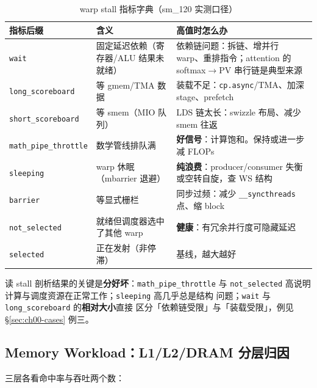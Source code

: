 \begin{table}[htbp]
\centering
\caption{warp stall 指标字典（sm\_120 实测口径）}
\label{tab:00-stall}
\begin{tabular}{lp{5.2cm}p{5.6cm}}
\toprule
指标后缀 & 含义 & 高值时怎么办 \\
\midrule
\texttt{wait} & 固定延迟依赖（寄存器/ALU 结果未就绪） & 依赖链问题：拆链、增并行 warp、重排指令；attention 的 softmax$\to$PV 串行链是典型来源 \\
\texttt{long\_\allowbreak{}scoreboard} & 等 gmem/TMA 数据 & 装载不足：\texttt{cp.async}/TMA、加深 stage、prefetch \\
\texttt{short\_\allowbreak{}scoreboard} & 等 smem（MIO 队列） & LDS 链太长：swizzle 布局、减少 smem 往返 \\
\texttt{math\_\allowbreak{}pipe\_\allowbreak{}throttle} & 数学管线排队满 & \textbf{好信号}：计算饱和。保持或进一步减 FLOPs \\
\texttt{sleeping} & warp 休眠（mbarrier 退避） & \textbf{纯浪费}：producer/consumer 失衡或空转自旋，查 WS 结构 \\
\texttt{barrier} & 等显式栅栏 & 同步过频：减少 \texttt{\_\allowbreak{}\_\allowbreak{}syncthreads} 点、缩 block \\
\texttt{not\_\allowbreak{}selected} & 就绪但调度器选中了其他 warp & \textbf{健康}：有冗余并行度可隐藏延迟 \\
\texttt{selected} & 正在发射（非停滞） & 基线，越大越好 \\
\bottomrule
\end{tabular}
\end{table}

读 stall 剖析结果的关键是\textbf{分好坏}：\texttt{math\_\allowbreak{}pipe\_\allowbreak{}throttle} 与
\texttt{not\_\allowbreak{}selected} 高说明计算与调度资源在正常工作；\texttt{sleeping} 高几乎总是结构
问题；\texttt{wait} 与 \texttt{long\_\allowbreak{}scoreboard} 的\textbf{相对大小}直接
区分「依赖链受限」与「装载受限」，例见 \S\ref{sec:ch00-cases} 例三。

\subsection{Memory Workload：L1/L2/DRAM 分层归因}

三层各看命中率与吞吐两个数：

